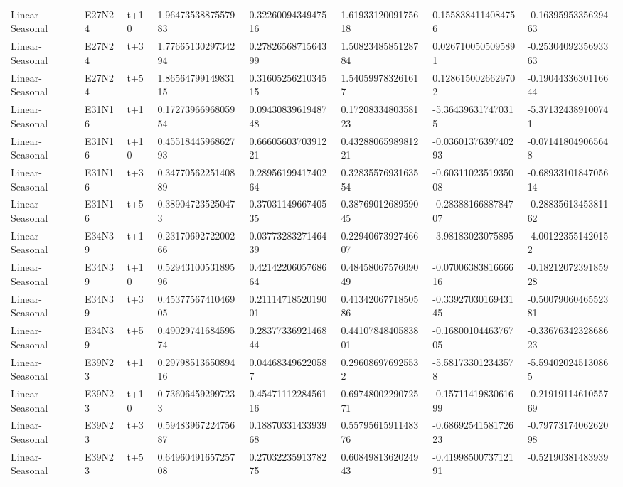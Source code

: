 \begin{landscape}
\begin{longtable}{llllllll}
Linear-Seasonal & E27N24 & t+10 & 1.9647353887557983 & 0.3226009434947516 & 1.6193312009175618 & 0.1558384114084756 & -0.1639595335629463 \\
Linear-Seasonal & E27N24 & t+3 & 1.7766513029734294 & 0.2782656871564399 & 1.5082348585128784 & 0.0267100505095891 & -0.2530409235693363 \\
Linear-Seasonal & E27N24 & t+5 & 1.8656479914983115 & 0.3160525621034515 & 1.540599783261617 & 0.1286150026629702 & -0.1904433630116644 \\
Linear-Seasonal & E31N16 & t+1 & 0.1727396696805954 & 0.0943083961948748 & 0.1720833480358123 & -5.364396317470315 & -5.371324389100741 \\
Linear-Seasonal & E31N16 & t+10 & 0.4551844596862793 & 0.6660560370391221 & 0.4328806598981221 & -0.0360137639740293 & -0.071418049065648 \\
Linear-Seasonal & E31N16 & t+3 & 0.3477056225140889 & 0.2895619941740264 & 0.3283557693163554 & -0.6031102351935008 & -0.6893310184705614 \\
Linear-Seasonal & E31N16 & t+5 & 0.389047235250473 & 0.3703114966740535 & 0.3876901268959045 & -0.2838816688784707 & -0.2883561345381162 \\
Linear-Seasonal & E34N39 & t+1 & 0.2317069272200266 & 0.0377328327146439 & 0.2294067392746607 & -3.98183023075895 & -4.001223551420152 \\
Linear-Seasonal & E34N39 & t+10 & 0.5294310053189596 & 0.4214220605768664 & 0.4845806757609049 & -0.0700638381666616 & -0.1821207239185928 \\
Linear-Seasonal & E34N39 & t+3 & 0.4537756741046905 & 0.2111471852019001 & 0.4134206771850586 & -0.3392703016943145 & -0.5007906046552381 \\
Linear-Seasonal & E34N39 & t+5 & 0.4902974168459574 & 0.2837733692146844 & 0.4410784840583801 & -0.1680010446376705 & -0.3367634232868623 \\
Linear-Seasonal & E39N23 & t+1 & 0.2979851365089416 & 0.044683496220587 & 0.296086976925532 & -5.581733012343578 & -5.594020245130865 \\
Linear-Seasonal & E39N23 & t+10 & 0.736064592997233 & 0.4547111228456116 & 0.6974800229072571 & -0.1571141983061699 & -0.2191911461055769 \\
Linear-Seasonal & E39N23 & t+3 & 0.5948396722475687 & 0.1887033143393968 & 0.5579561591148376 & -0.6869254158172623 & -0.7977317406262098 \\
Linear-Seasonal & E39N23 & t+5 & 0.6496049165725708 & 0.2703223591378275 & 0.6084981362024943 & -0.4199850073712191 & -0.52190381483939 \\

\end{longtable}
\end{landscape}
